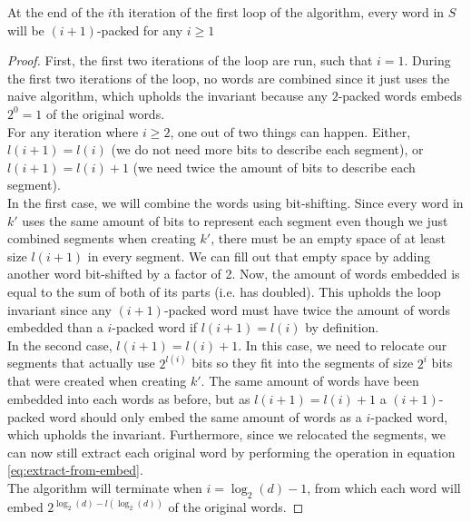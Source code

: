 \begin{invariant}
    At the end of the $i$th iteration of the first loop of the algorithm, every word in $S$ will be $(i+1)$-packed for any $i \geq 1$
\end{invariant}
\begin{proof}
    First, the first two iterations of the loop are run, such that $i=1$. During the first two iterations of the loop, no words are combined since it just uses the naive algorithm, which upholds the invariant because any $2$-packed words embeds $2^{0}=1$ of the original words.\\
    For any iteration where $i\geq 2$, one out of two things can happen. Either, $l(i+1) = l(i)$ (we do not need more bits to describe each segment), or $l(i + 1) = l(i) + 1$ (we need twice the amount of bits to describe each segment).\\
    In the first case, we will combine the words using bit-shifting. Since every word in $k'$ uses the same amount of bits to represent each segment even though we just combined segments when creating $k'$, there must be an empty space of at least size $l(i+1)$ in every segment. We can fill out that empty space by adding another word bit-shifted by a factor of 2. %
    Now, the amount of words embedded is equal to the sum of both of its parts (i.e. has doubled). This upholds the loop invariant since any $(i+1)$-packed word must have twice the amount of words embedded than a $i$-packed word if $l(i+1) = l(i)$ by definition.\\
    In the second case, $l(i + 1) = l(i) + 1$. In this case, we need to relocate our segments that actually use $2^{l(i)}$ bits so they fit into the segments of size $2^i$ bits that were created when creating $k'$.
    The same amount of words have been embedded into each words as before, but as $l(i+1) = l(i) + 1$ a $(i+1)$-packed word should only embed the same amount of words as a $i$-packed word, which upholds the invariant.
    Furthermore, since we relocated the segments, we can now still extract each original word by performing the operation in equation \ref{eq:extract-from-embed}.\\
    The algorithm will terminate when $i = \log_2(d) - 1$, from which each word will embed $2^{\log_2(d)-l(\log_2(d))}$ of the original words.
\end{proof}

